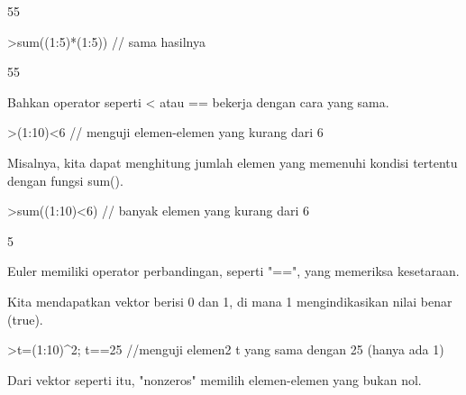 \documentclass[a4paper,10pt]{article}
\begin{document}
\begin{eulernotebook}
\begin{eulercomment}
\begin{eulercomment}
\begin{eulerprompt}
\end{eulerprompt}
\begin{euleroutput}
  55
\end{euleroutput}
\begin{eulerprompt}
>sum((1:5)*(1:5)) // sama hasilnya
\end{eulerprompt}
\begin{euleroutput}
  55
\end{euleroutput}
\begin{eulercomment}
Bahkan operator seperti \textless{} atau == bekerja dengan cara yang sama.
\end{eulercomment}
\begin{eulerprompt}
>(1:10)<6 // menguji elemen-elemen yang kurang dari 6
\end{eulerprompt}
\begin{euleroutput}
  [1,  1,  1,  1,  1,  0,  0,  0,  0,  0]
\end{euleroutput}
\begin{eulercomment}
Misalnya, kita dapat menghitung jumlah elemen yang memenuhi kondisi
tertentu dengan fungsi sum().
\end{eulercomment}
\begin{eulerprompt}
>sum((1:10)<6) // banyak elemen yang kurang dari 6
\end{eulerprompt}
\begin{euleroutput}
  5
\end{euleroutput}
\begin{eulercomment}
Euler memiliki operator perbandingan, seperti "==", yang memeriksa
kesetaraan.

Kita mendapatkan vektor berisi 0 dan 1, di mana 1 mengindikasikan
nilai benar (true).
\end{eulercomment}
\begin{eulerprompt}
>t=(1:10)^2; t==25 //menguji elemen2 t yang sama dengan 25 (hanya ada 1)
\end{eulerprompt}
\begin{euleroutput}
  [0,  0,  0,  0,  1,  0,  0,  0,  0,  0]
\end{euleroutput}
\begin{eulercomment}
Dari vektor seperti itu, "nonzeros" memilih elemen-elemen yang bukan
nol.


\end{eulercomment}
\end{eulercomment}
\end{eulercomment}
\end{eulernotebook}
\end{document}
